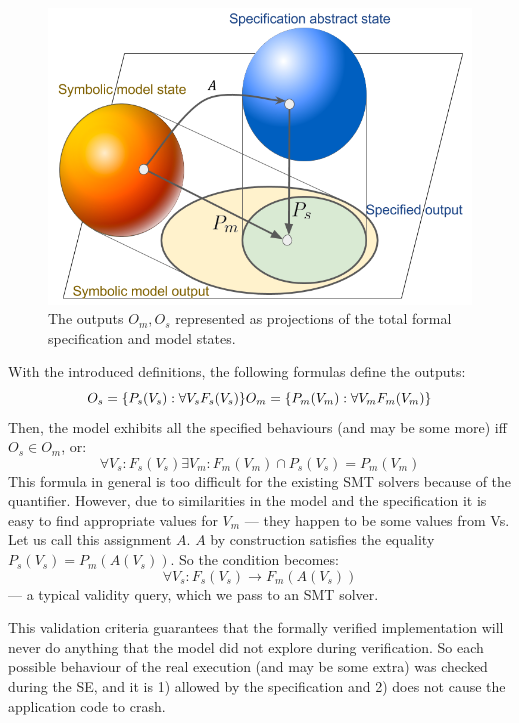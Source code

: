 \documentclass[letterpaper,twocolumn,10pt]{article}
\begin{document}
\begin{figure}[h]
    \centering
    \includegraphics[width=\columnwidth]{figures/projections.png}
    \caption{The outputs \(O_m, O_s\) represented as projections of the total
      formal specification and model states.}
    \label{projections}
\end{figure}

With the introduced definitions, the following formulas define the outputs:
\[
O_s = \{P_s(V_s): \forall V_s F_s(V_s)\} \\
O_m = \{P_m(V_m) : \forall V_m F_m(V_m)\}
\]
Then, the model exhibits all the specified behaviours (and may be some more) iff
\(O_s \in O_m\), or:
\[
\forall V_s : F_s(V_s) \exists V_m : F_m (V_m) \cap P_s(V_s) = P_m(V_m)
\]
This formula in general is too difficult for the existing SMT solvers because of
the quantifier. However, due to similarities in the model and the specification
it is easy to find appropriate values for \(V_m\) --- they happen to be some
values from Vs. Let us call this assignment \(A\). \(A\) by construction
satisfies the equality \(P_s(V_s)=P_m(A(V_s))\). So the condition becomes:
\[
\forall V_s : F_s(V_s) \rightarrow F_m(A(V_s))
\]
--- a typical validity query, which we pass  to an SMT solver.

This validation criteria guarantees that the formally verified implementation
will never do anything that the model did not explore during verification. So
each possible behaviour of the real execution (and may be some extra) was
checked during the SE, and it is 1) allowed by the specification and 2) does not
cause the application code to crash.
\end{document}
